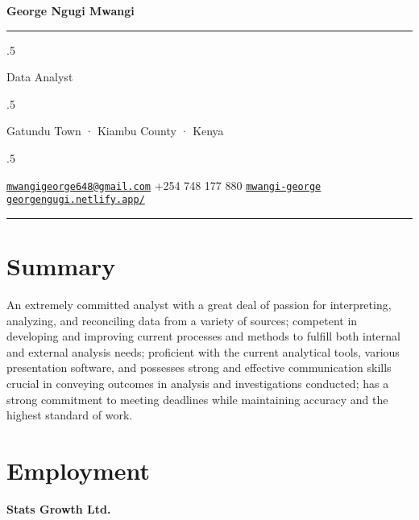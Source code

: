 \documentclass[11pt,]{article}
\begin{document}
\centerline{\huge \bf George Ngugi Mwangi}

\vspace{2 mm}

\hrule

\vspace{2 mm}

\moveleft.5\hoffset\centerline{Data Analyst}
\moveleft.5\hoffset\centerline{Gatundu Town · Kiambu County · Kenya}
\moveleft.5\hoffset\centerline{ \faEnvelopeO \hspace{1 mm} \href{mailto:}{\tt \href{mailto:mwangigeorge648@gmail.com}{\nolinkurl{mwangigeorge648@gmail.com}}} \hspace{1 mm}  \faPhone \hspace{1 mm}  +254
748 177
880  \hspace{1 mm}  \faGithub \hspace{1 mm} \href{http://github.com/mwangi-george}{\tt mwangi-george} \hspace{1 mm}      \faGlobe \hspace{1 mm} \href{http://georgengugi.netlify.app/}{\tt georgengugi.netlify.app/}   }



\vspace{2 mm}

\hrule



\hypertarget{summary}{%
\section{Summary}\label{summary}}

An extremely committed analyst with a great deal of passion for
interpreting, analyzing, and reconciling data from a variety of sources;
competent in developing and improving current processes and methods to
fulfill both internal and external analysis needs; proficient with the
current analytical tools, various presentation software, and possesses
strong and effective communication skills crucial in conveying outcomes
in analysis and investigations conducted; has a strong commitment to
meeting deadlines while maintaining accuracy and the highest standard of
work.

\hypertarget{employment}{%
\section{Employment}\label{employment}}

\textbf{Stats Growth Ltd.}
\end{document}
